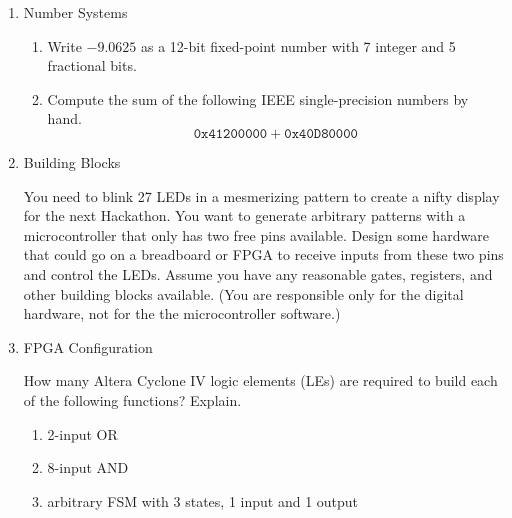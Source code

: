 \documentclass{e85}
\date{2019}
\author{}
\begin{document}
\begin{enumerate}
\item Number Systems
  \begin{enumerate}
  \item Write \(-9.0625\) as a 12-bit fixed-point number with 7
    integer and 5 fractional bits.

    \begin{solution}
    \end{solution}

  \item Compute the sum of the following IEEE single-precision numbers
    by hand.
    \[
      \mathtt{0x41200000} + \mathtt{0x40D80000}
    \]

    \begin{solution}
    \end{solution}
  \end{enumerate}

\item Building Blocks

  You need to blink 27 LEDs in a mesmerizing pattern to create a nifty
  display for the next Hackathon.  You want to generate arbitrary
  patterns with a microcontroller that only has two free pins
  available.  Design some hardware that could go on a breadboard or
  FPGA to receive inputs from these two pins and control the LEDs.
  Assume you have any reasonable gates, registers, and other building
  blocks available.  (You are responsible only for the digital
  hardware, not for the the microcontroller software.)

  \begin{solution}
  \end{solution}

\item FPGA Configuration

  How many Altera Cyclone IV logic elements (LEs) are required to
  build each of the following functions?  Explain.
  \begin{enumerate}
  \item 2-input OR

    \begin{solution}
    \end{solution}

  \item 8-input AND

    \begin{solution}
    \end{solution}

  \item arbitrary FSM with 3 states, 1 input and 1 output


\end{enumerate}
\end{enumerate}
\end{document}
